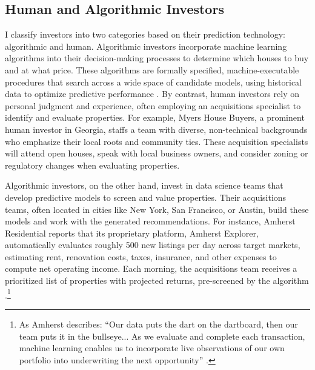 \documentclass[11pt]{article}
\newcommand{\LR}[1]{{\color{blue}{[LR: #1]}}}
\begin{document}
\subsection{Human and Algorithmic Investors}
I classify investors into two categories based on their prediction technology: algorithmic and human. Algorithmic investors incorporate machine learning algorithms into their decision-making processes to determine which houses to buy and at what price. These algorithms are formally specified, machine-executable procedures that search across a wide space of candidate models, using historical data to optimize predictive performance \citep{mitchell2015}. By contrast, human investors rely on personal judgment and experience, often employing an acquisitions specialist to identify and evaluate properties. For example, Myers House Buyers, a prominent human investor in Georgia, staffs a team with diverse, non-technical backgrounds who emphasize their local roots and community ties. These acquisition specialists will attend open houses, speak with local business owners, and consider zoning or regulatory changes when evaluating properties.  


Algorithmic investors, on the other hand, invest in data science teams that develop predictive models to screen and value properties. Their acquisitions teams, often located in cities like New York, San Francisco, or Austin, build these models and work with the generated recommendations. For instance, Amherst Residential reports that its proprietary platform, Amherst Explorer, automatically evaluates roughly 500 new listings per day across target markets, estimating rent, renovation costs, taxes, insurance, and other expenses to compute net operating income. Each morning, the acquisitions team receives a prioritized list of properties with projected returns, pre-screened by the algorithm \citep{amherstsfr2016}.\footnote{As Amherst describes: “Our data puts the dart on the dartboard, then our team puts it in the bullseye... As we evaluate and complete each transaction, machine learning enables us to incorporate live observations of our own portfolio into underwriting the next opportunity” \citep{kapoor_ai_2024}.}
\end{document}
